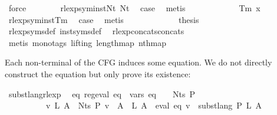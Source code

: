 \begin{isabellebody}
\ force\isanewline
\ \ \ \ \ \ \isamarkupfalse%
\ rlexp{\isacharunderscore}{\kern0pt}sym{\isacharunderscore}{\kern0pt}inst{\isacharunderscore}{\kern0pt}Nt\ Nt\ \isamarkupfalse%
\ {\isacharquery}{\kern0pt}case\ \isamarkupfalse%
\ metis\isanewline
\ \ \ \ \isamarkupfalse%
\isanewline
\ \ \ \ \ \ \isamarkupfalse%
\ {\isacharparenleft}{\kern0pt}Tm\ x{\isacharparenright}{\kern0pt}\isanewline
\ \ \ \ \ \ \isamarkupfalse%
\ rlexp{\isacharunderscore}{\kern0pt}sym{\isacharunderscore}{\kern0pt}inst{\isacharunderscore}{\kern0pt}Tm\ \isamarkupfalse%
\ {\isacharquery}{\kern0pt}case\ \isamarkupfalse%
\ metis\isanewline
\ \ \ \ \isamarkupfalse%
\isanewline
\ \ \isamarkupfalse%
\isanewline
\ \ \isamarkupfalse%
\ \isamarkupfalse%
\ {\isacharquery}{\kern0pt}thesis\ \isamarkupfalse%
\ rlexp{\isacharunderscore}{\kern0pt}syms{\isacharunderscore}{\kern0pt}def\ inst{\isacharunderscore}{\kern0pt}syms{\isacharunderscore}{\kern0pt}def\ \isamarkupfalse%
\ rlexp{\isacharunderscore}{\kern0pt}concats{\isacharunderscore}{\kern0pt}concats\isanewline
\ \ \ \ \isamarkupfalse%
\ {\isacharparenleft}{\kern0pt}metis\ {\isacharparenleft}{\kern0pt}mono{\isacharunderscore}{\kern0pt}tags{\isacharcomma}{\kern0pt}\ lifting{\isacharparenright}{\kern0pt}\ length{\isacharunderscore}{\kern0pt}map\ nth{\isacharunderscore}{\kern0pt}map{\isacharparenright}{\kern0pt}\isanewline
{}\isamarkupfalse%
%
\endisatagproof
{\isafoldproof}%
%
\isadelimproof
%
\endisadelimproof
%
\begin{isamarkuptext}%
Each non-terminal of the CFG induces some  equation. We do not directly construct
the equation but only prove its existence:%
\end{isamarkuptext}\isamarkuptrue%
\isamarkupfalse%
\ subst{\isacharunderscore}{\kern0pt}lang{\isacharunderscore}{\kern0pt}rlexp{\isacharcolon}{\kern0pt}\isanewline
\ \ {\isachardoublequoteopen}{\isasymexists}eq{\isachardot}{\kern0pt}\ reg{\isacharunderscore}{\kern0pt}eval\ eq\ {\isasymand}\ vars\ eq\ {\isasymsubseteq}\ {\isasymgamma}{\isacharprime}{\kern0pt}\ {\isacharbackquote}{\kern0pt}\ Nts\ P\isanewline
\ \ \ \ \ \ \ \ \ {\isasymand}\ {\isacharparenleft}{\kern0pt}{\isasymforall}v\ L{\isachardot}{\kern0pt}\ {\isacharparenleft}{\kern0pt}{\isasymforall}A\ {\isasymin}\ Nts\ P{\isachardot}{\kern0pt}\ v\ {\isacharparenleft}{\kern0pt}{\isasymgamma}{\isacharprime}{\kern0pt}\ A{\isacharparenright}{\kern0pt}\ {\isacharequal}{\kern0pt}\ L\ A{\isacharparenright}{\kern0pt}\ {\isasymlongrightarrow}\ eval\ eq\ v\ {\isacharequal}{\kern0pt}\ subst{\isacharunderscore}{\kern0pt}lang\ P\ L\ A{\isacharparenright}{\kern0pt}{\isachardoublequoteclose}\isanewline

\end{isabellebody}
